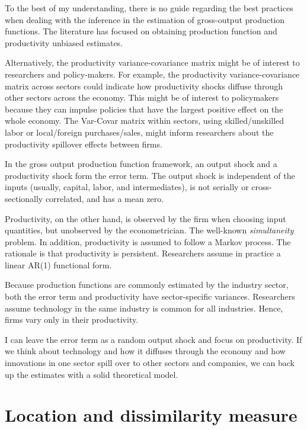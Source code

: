 \documentclass[
]{article}
\begin{document}
To the best of my understanding, there is no guide regarding the best
practices when dealing with the inference in the estimation of
gross-output production functions. The literature has focused on
obtaining production function and productivity unbiased estimates.

Alternatively, the productivity variance-covariance matrix might be of
interest to researchers and policy-makers. For example, the productivity
variance-covariance matrix across sectors could indicate how
productivity shocks diffuse through other sectors across the economy.
This might be of interest to policymakers because they can impulse
policies that have the largest positive effect on the whole economy. The
Var-Covar matrix within sectors, using skilled/unskilled labor or
local/foreign purchases/sales, might inform researchers about the
productivity spillover effects between firms.

In the gross output production function framework, an output shock and a
productivity shock form the error term. The output shock is independent
of the inputs (usually, capital, labor, and intermediates), is not
serially or cross-sectionally correlated, and has a mean zero.

Productivity, on the other hand, is observed by the firm when choosing
input quantities, but unobserved by the econometrician. The well-known
\emph{simultaneity} problem. In addition, productivity is assumed to
follow a Markov process. The rationale is that productivity is
persistent. Researchers assume in practice a linear AR(1) functional
form.

Because production functions are commonly estimated by the industry
sector, both the error term and productivity have sector-specific
variances. Researchers assume technology in the same industry is common
for all industries. Hence, firms vary only in their productivity.

I can leave the error term as a random output shock and focus on
productivity. If we think about technology and how it diffuses through
the economy and how innovations in one sector spill over to other
sectors and companies, we can back up the estimates with a solid
theoretical model.

\hypertarget{location-and-dissimilarity-measure}{%
\section{Location and dissimilarity
measure}\label{location-and-dissimilarity-measure}}
\end{document}

